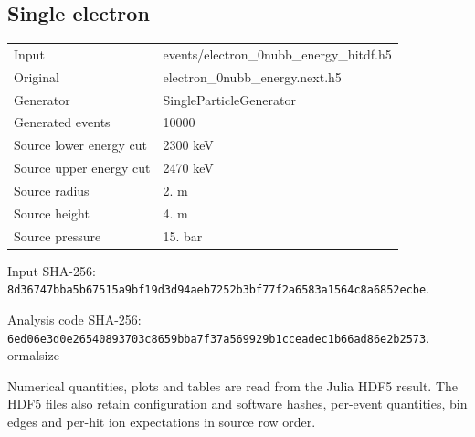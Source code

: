 \documentclass[10pt,a4paper]{article}
\begin{document}
\subsection*{Single electron}
\begin{tabular}{lp{.65\linewidth}}\toprule
Input & events/electron\_0nubb\_energy\_hitdf.h5 \\
Original & electron\_0nubb\_energy.next.h5 \\
Generator & SingleParticleGenerator \\
Generated events & 10000 \\
Source lower energy cut & 2300 keV \\
Source upper energy cut & 2470 keV \\
Source radius & 2. m \\
Source height & 4. m \\
Source pressure & 15. bar \\
\bottomrule\end{tabular}
\par\small Input SHA-256: \texttt{8d36747bba5b67515a9bf19d3d94aeb7252b3bf77f2a6583a1564c8a6852ecbe}.
\par Analysis code SHA-256: \texttt{6ed06e3d0e26540893703c8659bba7f37a569929b1cceadec1b66ad86e2b2573}.
ormalsize
\par Numerical quantities, plots and tables are read from the Julia HDF5 result.
The HDF5 files also retain configuration and software hashes, per-event
quantities, bin edges and per-hit ion expectations in source row order.

\end{document}
